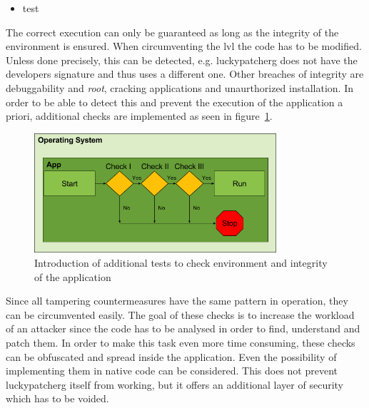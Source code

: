 \begin{itemize}
    \item test
\end{itemize}
The correct execution can only be guaranteed as long as the integrity of the environment is ensured.
When circumventing the \gls{lvl} the code has to be modified.
Unless done precisely, this can be detected, e.g. \gls{luckypatcherg} does not have the developers signature and thus uses a different one.
Other breaches of integrity are debuggability and \textit{root}, cracking applications and unaurthorized installation.
In order to be able to detect this and prevent the execution of the application a priori, additional checks are implemented as seen in figure~\ref{fig:verificationNowAdditional}.
\begin{figure}[h]
    \centering
    \includegraphics[width=0.8\textwidth]{data/verificationNowAdditional.png}
    \caption{Introduction of additional tests to check environment and integrity of the application}
    \label{fig:verificationNowAdditional}
\end{figure}
Since all tampering countermeasures have the same pattern in operation, they can be circumvented easily.
The goal of these checks is to increase the workload of an attacker since the code has to be analysed in order to find, understand and patch them.
In order to make this task even more time consuming, these checks can be obfuscated and spread inside the application.
Even the possibility of implementing them in native code can be considered.
\newline
This does not prevent \gls{luckypatcherg} itself from working, but it offers an additional layer of security which has to be voided.
